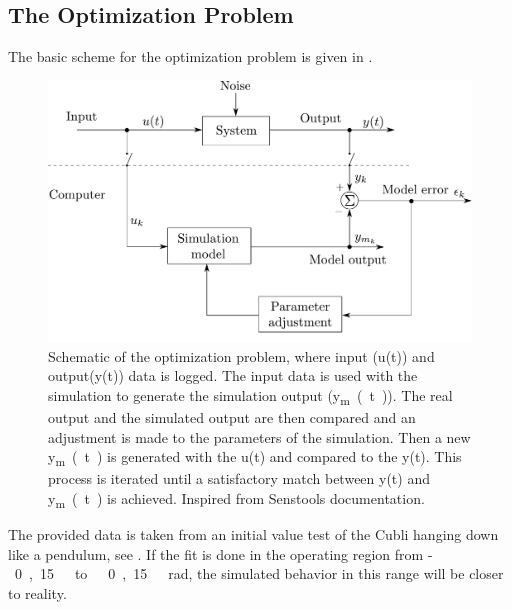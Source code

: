 \subsection{The Optimization Problem}
The basic scheme for the optimization problem is given in .
%
\begin{figure}[H]
	\centering
	\includegraphics[scale=0.4]{figures/senstoolsModelOptimizationHM}
%	
	\caption{Schematic of the optimization problem, where input (u(t)) and output(y(t)) data is logged. The input data is used with the simulation to generate the simulation output (\si{y_{m}(t)}). The real output and the simulated output are then compared and an adjustment is made to the parameters of the simulation. Then a new \si{y_{m}(t)} is generated with the u(t) and compared to the y(t). This process is iterated until a satisfactory match between y(t) and \si{y_{m}(t)} is achieved. Inspired from Senstools documentation.\cite{Senstools}}
	\label{SensToolSchema}
\end{figure}
%
The provided data is taken from an initial value test of the Cubli hanging down like a pendulum, see .
If the fit is done in the operating region from \si{-0,15\ to\ 0,15\ rad}, the simulated behavior in this range will be closer to reality.

